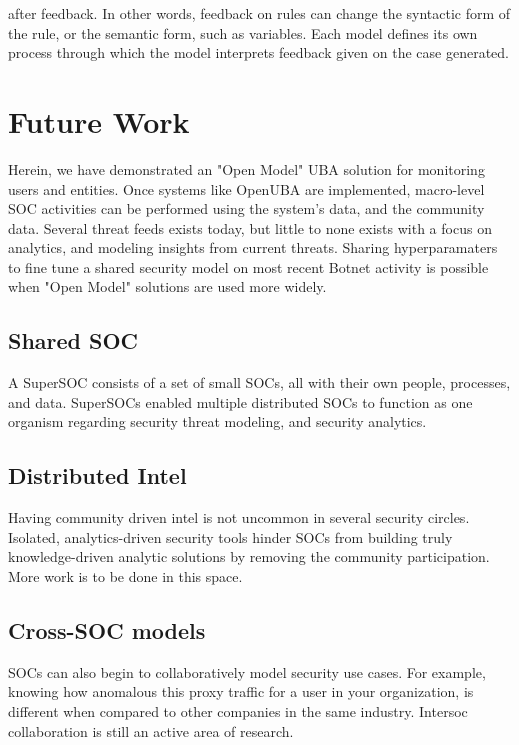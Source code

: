 \documentclass[10pt, titlepage, twocolumn]{report}
\begin{document}
after feedback. In other words, feedback on rules can change the syntactic form of the rule, or the semantic form, such as variables. Each model defines its own process through which the model interprets feedback given on the case generated. 



\section{Future Work}

Herein, we have demonstrated an "Open Model" UBA solution for monitoring users and entities. Once systems like OpenUBA are implemented, macro-level SOC activities can be performed using the system's data, and the community data. Several threat feeds exists today, but little to none exists with a focus on analytics, and modeling insights from current threats. Sharing hyperparamaters to fine tune a shared security model on most recent Botnet activity is possible when "Open Model" solutions are used more widely. 

\subsection{Shared SOC}
A SuperSOC consists of a set of small SOCs, all with their own people, processes, and data. SuperSOCs enabled multiple distributed SOCs to function as one organism regarding security threat modeling, and security analytics.


\subsection{Distributed Intel}
Having community driven intel is not uncommon in several security circles. Isolated, analytics-driven security tools hinder SOCs from building truly knowledge-driven analytic solutions by removing the community participation. More work is to be done in this space. 

\subsection{Cross-SOC models}
SOCs can also begin to collaboratively model security use cases. For example, knowing how anomalous this proxy traffic for a user in your organization, is different when compared to other companies in the same industry. Intersoc collaboration is still an active area of research.
\end{document}
